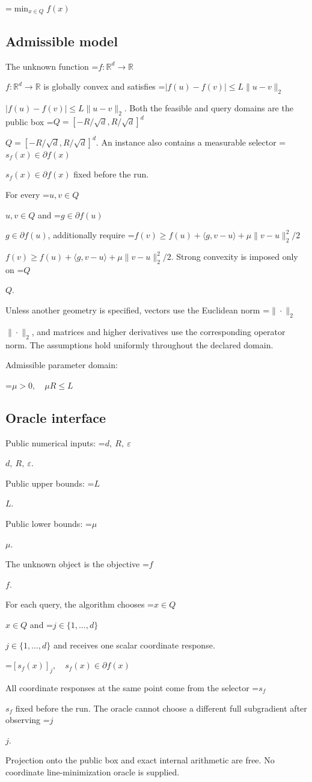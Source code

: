 \documentclass[10pt,a4paper]{article}
\newcommand{\AtlasMath}[1]{\par\begingroup\centering\setbox0=\hbox{$\displaystyle #1$}\ifdim\wd0>1.4\linewidth\typeout{ATLAS WIDE FORMULA: \the\wd0}\fi\ifdim\wd0>\linewidth\resizebox{\linewidth}{!}{\box0}\else\box0\fi\par\endgroup}
\newcommand{\AtlasInlineMath}[1]{\begingroup\setbox0=\hbox{$#1$}\ifdim\wd0>.4\linewidth\endgroup\AtlasMath{#1}\else\endgroup$#1$\fi}
\begin{document}
\AtlasMath{\min_{x\in Q}f(x)}


\subsection{Admissible model}
The unknown function \AtlasInlineMath{f:\mathbb R^d\to\mathbb R} is globally convex and satisfies \AtlasInlineMath{|f(u)-f(v)|\le L\|u-v\|_2}. Both the feasible and query domains are the public box \AtlasInlineMath{Q=[-R/\sqrt d,R/\sqrt d]^d}. An instance also contains a measurable selector \AtlasInlineMath{s_f(x)\in\partial f(x)} fixed before the run.

For every \AtlasInlineMath{u,v\in Q} and \AtlasInlineMath{g\in\partial f(u)}, additionally require \AtlasInlineMath{f(v)\ge f(u)+\langle g,v-u\rangle+\mu\|v-u\|_2^2/2}. Strong convexity is imposed only on \AtlasInlineMath{Q}.

Unless another geometry is specified, vectors use the Euclidean norm \AtlasInlineMath{\|\cdot\|_2}, and matrices and higher derivatives use the corresponding operator norm. The assumptions hold uniformly throughout the declared domain.

Admissible parameter domain:


\AtlasMath{\mu>0,\quad\mu R\le L}


\subsection{Oracle interface}
Public numerical inputs: \AtlasInlineMath{d,\ R,\ \varepsilon}.

Public upper bounds: \AtlasInlineMath{L}.

Public lower bounds: \AtlasInlineMath{\mu}.

The unknown object is the objective \AtlasInlineMath{f}.

For each query, the algorithm chooses \AtlasInlineMath{x\in Q} and \AtlasInlineMath{j\in\{1,\ldots,d\}} and receives one scalar coordinate response.


\AtlasMath{[s_f(x)]_j,\quad s_f(x)\in\partial f(x)}


All coordinate responses at the same point come from the selector \AtlasInlineMath{s_f} fixed before the run. The oracle cannot choose a different full subgradient after observing \AtlasInlineMath{j}.

Projection onto the public box and exact internal arithmetic are free. No coordinate line-minimization oracle is supplied.
\end{document}
